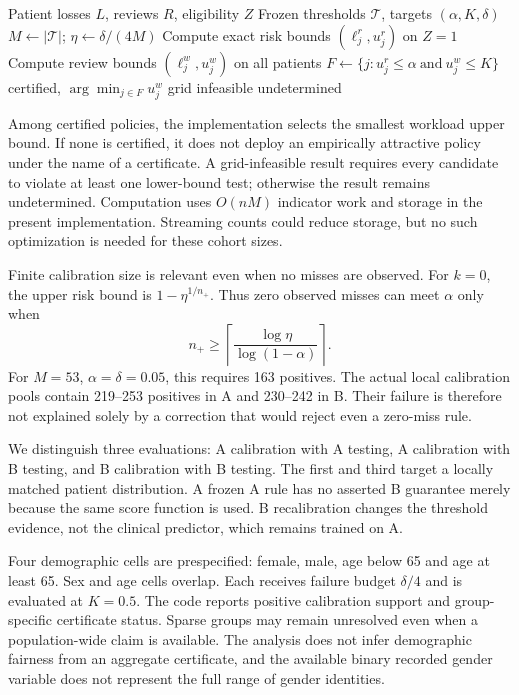 \begin{algorithm}[t]
\caption{Joint certification on a frozen grid}
\begin{algorithmic}
\Require Patient losses $L$, reviews $R$, eligibility $Z$
\Require Frozen thresholds $\mathcal T$, targets $(\alpha,K,\delta)$
\State $M\gets |\mathcal T|$; $\eta\gets\delta/(4M)$
\State Compute exact risk bounds $(\ell_j^r,u_j^r)$ on $Z=1$
\State Compute review bounds $(\ell_j^w,u_j^w)$ on all patients
\EndFor
\State $F\gets\{j:u_j^r\le\alpha\ \text{and}\ u_j^w\le K\}$
\State \Return certified, $\arg\min_{j\in F}u_j^w$
\State \Return grid infeasible
\Else
\State \Return undetermined
\EndIf
\end{algorithmic}
\end{algorithm}

Among certified policies, the implementation selects the smallest workload upper bound. If none is certified, it does not deploy an empirically attractive policy under the name of a certificate. A grid-infeasible result requires every candidate to violate at least one lower-bound test; otherwise the result remains undetermined. Computation uses $O(nM)$ indicator work and storage in the present implementation. Streaming counts could reduce storage, but no such optimization is needed for these cohort sizes.

Finite calibration size is relevant even when no misses are observed. For $k=0$, the upper risk bound is $1-\eta^{1/n_+}$. Thus zero observed misses can meet $\alpha$ only when
\begin{equation*}
 n_+\ge \left\lceil\frac{\log\eta}{\log(1-\alpha)}\right\rceil.
\end{equation*}
For $M=53$, $\alpha=\delta=0.05$, this requires 163 positives. The actual local calibration pools contain 219--253 positives in A and 230--242 in B. Their failure is therefore not explained solely by a correction that would reject even a zero-miss rule.

We distinguish three evaluations: A calibration with A testing, A calibration with B testing, and B calibration with B testing. The first and third target a locally matched patient distribution. A frozen A rule has no asserted B guarantee merely because the same score function is used. B recalibration changes the threshold evidence, not the clinical predictor, which remains trained on A.

Four demographic cells are prespecified: female, male, age below 65 and age at least 65. Sex and age cells overlap. Each receives failure budget $\delta/4$ and is evaluated at $K=0.5$. The code reports positive calibration support and group-specific certificate status. Sparse groups may remain unresolved even when a population-wide claim is available. The analysis does not infer demographic fairness from an aggregate certificate, and the available binary recorded gender variable does not represent the full range of gender identities.

